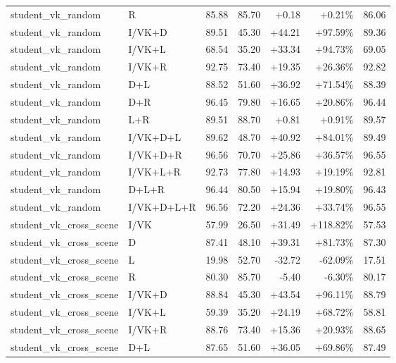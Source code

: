 \documentclass[UTF8,10pt,a4paper]{ctexart}
\newcommand{\better}[1]{\textcolor{ImpBlue}{#1}}
\newcommand{\worse}[1]{\textcolor{DropRed}{#1}}
\begin{document}
{\begin{longtable}{llrrrrr}
student\_vk\_random & R & 85.88 & 85.70 & \better{+0.18} & \better{+0.21\%} & 86.06\\
student\_vk\_random & I/VK+D & 89.51 & 45.30 & \better{+44.21} & \better{+97.59\%} & 89.36\\
student\_vk\_random & I/VK+L & 68.54 & 35.20 & \better{+33.34} & \better{+94.73\%} & 69.05\\
student\_vk\_random & I/VK+R & 92.75 & 73.40 & \better{+19.35} & \better{+26.36\%} & 92.82\\
student\_vk\_random & D+L & 88.52 & 51.60 & \better{+36.92} & \better{+71.54\%} & 88.39\\
student\_vk\_random & D+R & 96.45 & 79.80 & \better{+16.65} & \better{+20.86\%} & 96.44\\
student\_vk\_random & L+R & 89.51 & 88.70 & \better{+0.81} & \better{+0.91\%} & 89.57\\
student\_vk\_random & I/VK+D+L & 89.62 & 48.70 & \better{+40.92} & \better{+84.01\%} & 89.49\\
student\_vk\_random & I/VK+D+R & 96.56 & 70.70 & \better{+25.86} & \better{+36.57\%} & 96.55\\
student\_vk\_random & I/VK+L+R & 92.73 & 77.80 & \better{+14.93} & \better{+19.19\%} & 92.81\\
student\_vk\_random & D+L+R & 96.44 & 80.50 & \better{+15.94} & \better{+19.80\%} & 96.43\\
student\_vk\_random & I/VK+D+L+R & 96.56 & 72.20 & \better{+24.36} & \better{+33.74\%} & 96.55\\
student\_vk\_cross\_scene & I/VK & 57.99 & 26.50 & \better{+31.49} & \better{+118.82\%} & 57.53\\
student\_vk\_cross\_scene & D & 87.41 & 48.10 & \better{+39.31} & \better{+81.73\%} & 87.30\\
student\_vk\_cross\_scene & L & 19.98 & 52.70 & \worse{-32.72} & \worse{-62.09\%} & 17.51\\
student\_vk\_cross\_scene & R & 80.30 & 85.70 & \worse{-5.40} & \worse{-6.30\%} & 80.17\\
student\_vk\_cross\_scene & I/VK+D & 88.84 & 45.30 & \better{+43.54} & \better{+96.11\%} & 88.79\\
student\_vk\_cross\_scene & I/VK+L & 59.39 & 35.20 & \better{+24.19} & \better{+68.72\%} & 58.81\\
student\_vk\_cross\_scene & I/VK+R & 88.76 & 73.40 & \better{+15.36} & \better{+20.93\%} & 88.65\\
student\_vk\_cross\_scene & D+L & 87.65 & 51.60 & \better{+36.05} & \better{+69.86\%} & 87.49\\

\end{longtable}}
\end{document}
